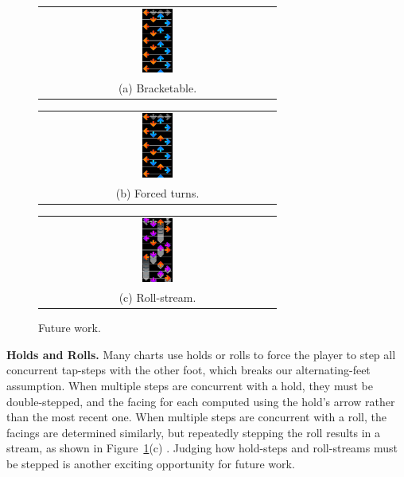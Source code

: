 \documentclass[10pt]{sigplanconf}
\begin{document}
\begin{figure}[t]
	\begin{tabular}{c}
	\includegraphics[width=0.13\textwidth]{future-a.png} \\
	\small (a) Bracketable.
	\end{tabular}
	\begin{tabular}{c}
	\includegraphics[width=0.13\textwidth]{future-b.png} \\
	\small (b) Forced turns.
	\end{tabular}
	\begin{tabular}{c}
	\includegraphics[width=0.13\textwidth]{boten.png} \\
	\small (c) Roll-stream.
	\end{tabular}
	\caption{Future work.}
	\label{fig:future}
\end{figure}

{\bf Holds and Rolls.}
Many charts use holds or rolls to force the player to step all concurrent tap-steps with the other foot, which breaks our alternating-feet assumption.
When multiple steps are concurrent with a hold, they must be double-stepped, and the facing for each computed using the hold's arrow rather than the most recent one.
When multiple steps are concurrent with a roll, the facings are determined similarly, but repeatedly stepping the roll results in a stream, as shown in Figure~\ref{fig:future}(c) \cite{botenanna}.
Judging how hold-steps and roll-streams must be stepped is another exciting opportunity for future work.
\end{document}

